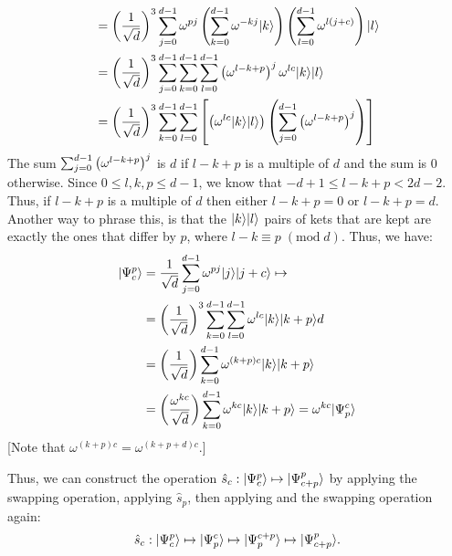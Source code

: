 \begin{enumerate}
\begin{equation}
\begin{split}
                     &= \left(\frac{1}{\sqrt{d}}\right)^3 \sum_{j=0}^{d-1} \omega^{pj}  \left(\sum_{k=0}^{d-1} \omega^{-kj} | k \rangle\right) \left(\sum_{l=0}^{d-1} \omega^{l(j+c)}\right) | l \rangle \\
                     &= \left(\frac{1}{\sqrt{d}}\right)^3 \sum_{j=0}^{d-1}  \sum_{k=0}^{d-1} \sum_{l=0}^{d-1} \left(\omega^{l - k + p}\right)^j \omega^{lc} | k \rangle | l \rangle  \\
                     &= \left(\frac{1}{\sqrt{d}}\right)^3  \sum_{k=0}^{d-1} \sum_{l=0}^{d-1} \left[ \left(\omega^{lc} | k \rangle | l \rangle\right)\left( \sum_{j=0}^{d-1}\left(\omega^{l - k + p}\right)^j \right)\right] \\
    \end{split}
  \end{equation}
The sum $\sum_{j=0}^{d-1}\left(\omega^{l - k + p}\right)^j$ is $d$ if $l - k + p$ is a multiple of $d$ and the sum is $0$ otherwise. Since $0 \leq l, k, p \leq d-1$, we know that $-d + 1 \leq l - k + p < 2d - 2$. Thus, if $l - k + p$ is a multiple of $d$ then either $l - k + p = 0$ or $l - k + p = d$. Another way to phrase this, is that the $| k \rangle | l \rangle$ pairs of kets that are kept are exactly the ones that differ by $p$, where $l - k \equiv p \;(\text{mod}\; d)$. Thus, we have:
    \begin{equation}
    \begin{split}
      | \Psi_c^p \rangle &= \frac{1}{\sqrt{d}}\sum_{j=0}^{d-1} \omega^{pj} | j \rangle | j+c \rangle \mapsto \\
                     &= \left(\frac{1}{\sqrt{d}}\right)^3  \sum_{k=0}^{d-1} \sum_{l=0}^{d-1} \omega^{lc} | k \rangle | k + p \rangle d\\
                     &= \left(\frac{1}{\sqrt{d}}\right)  \sum_{k=0}^{d-1} \omega^{(k + p)c} | k \rangle | k + p \rangle\\
                     &= \left(\frac{\omega^{kc}}{\sqrt{d}}\right)  \sum_{k=0}^{d-1} \omega^{kc} | k \rangle | k + p \rangle = \omega^{kc} | \Psi_p^c \rangle \\
    \end{split}
  \end{equation}
  [Note that $\omega^{(k + p)c} = \omega^{(k + p + d)c}$.]

  Thus, we can construct the operation $\hat{s}_c: | \Psi_c^p \rangle \mapsto | \Psi_{c+p}^{p} \rangle$ by applying the swapping operation, applying $\hat{s}_p$, then applying and the swapping operation again:
  \begin{equation}
    \hat{s}_c: | \Psi_c^p \rangle \mapsto | \Psi_{p}^{c} \rangle \mapsto | \Psi_{p}^{c + p} \rangle \mapsto | \Psi_{c + p}^{p} \rangle.
  \end{equation}
\end{enumerate}


